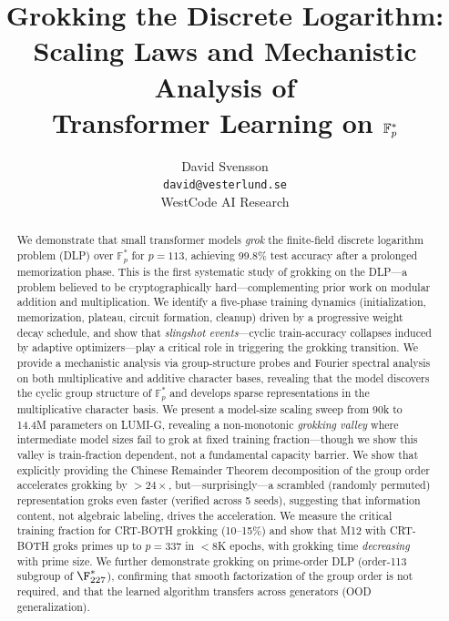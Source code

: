 \documentclass[11pt]{article}
\title{Grokking the Discrete Logarithm: \\
Scaling Laws and Mechanistic Analysis of \\
Transformer Learning on $\Fps$}
\author{
David Svensson \\
\texttt{david@vesterlund.se} \\
WestCode AI Research
}
\date{}
\newcommand{\Fps}{\mathbb{F}_p^*}
\begin{document}
\maketitle

\begin{abstract}
We demonstrate that small transformer models \emph{grok} the finite-field discrete logarithm problem (DLP) over $\Fps$ for $p = 113$, achieving 99.8\% test accuracy after a prolonged memorization phase. This is the first systematic study of grokking on the DLP---a problem believed to be cryptographically hard---complementing prior work on modular addition and multiplication. We identify a five-phase training dynamics (initialization, memorization, plateau, circuit formation, cleanup) driven by a progressive weight decay schedule, and show that \emph{slingshot events}---cyclic train-accuracy collapses induced by adaptive optimizers---play a critical role in triggering the grokking transition. We provide a mechanistic analysis via group-structure probes and Fourier spectral analysis on both multiplicative and additive character bases, revealing that the model discovers the cyclic group structure of $\Fps$ and develops sparse representations in the multiplicative character basis. We present a model-size scaling sweep from 90k to 14.4M parameters on LUMI-G, revealing a non-monotonic \emph{grokking valley} where intermediate model sizes fail to grok at fixed training fraction---though we show this valley is train-fraction dependent, not a fundamental capacity barrier. We show that explicitly providing the Chinese Remainder Theorem decomposition of the group order accelerates grokking by $>24\times$, but---surprisingly---a scrambled (randomly permuted) representation groks even faster (verified across 5 seeds), suggesting that information content, not algebraic labeling, drives the acceleration. We measure the critical training fraction for CRT-BOTH grokking (10--15\%) and show that M12 with CRT-BOTH groks primes up to $p = 337$ in $<$8K epochs, with grokking time \emph{decreasing} with prime size. We further demonstrate grokking on prime-order DLP (order-113 subgroup of $\F_{227}^*$), confirming that smooth factorization of the group order is not required, and that the learned algorithm transfers across generators (OOD generalization).
\end{abstract}


\end{document}
